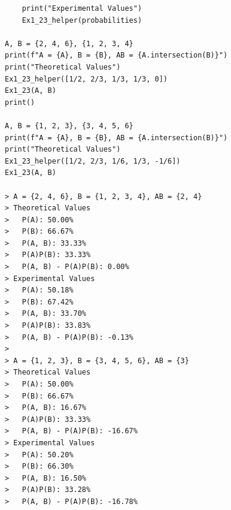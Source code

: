 \documentclass{article}
\begin{document}
\begin{enumerate}
\begin{itemize}
\begin{verbatim}
    print("Experimental Values")
    Ex1_23_helper(probabilities)

A, B = {2, 4, 6}, {1, 2, 3, 4}
print(f"A = {A}, B = {B}, AB = {A.intersection(B)}")
print("Theoretical Values")
Ex1_23_helper([1/2, 2/3, 1/3, 1/3, 0])
Ex1_23(A, B)
print()

A, B = {1, 2, 3}, {3, 4, 5, 6}
print(f"A = {A}, B = {B}, AB = {A.intersection(B)}")
print("Theoretical Values")
Ex1_23_helper([1/2, 2/3, 1/6, 1/3, -1/6])
Ex1_23(A, B)

> A = {2, 4, 6}, B = {1, 2, 3, 4}, AB = {2, 4}
> Theoretical Values
> 	P(A): 50.00%
> 	P(B): 66.67%
> 	P(A, B): 33.33%
> 	P(A)P(B): 33.33%
> 	P(A, B) - P(A)P(B): 0.00%
> Experimental Values
> 	P(A): 50.18%
> 	P(B): 67.42%
> 	P(A, B): 33.70%
> 	P(A)P(B): 33.83%
> 	P(A, B) - P(A)P(B): -0.13%
> 
> A = {1, 2, 3}, B = {3, 4, 5, 6}, AB = {3}
> Theoretical Values
> 	P(A): 50.00%
> 	P(B): 66.67%
> 	P(A, B): 16.67%
> 	P(A)P(B): 33.33%
> 	P(A, B) - P(A)P(B): -16.67%
> Experimental Values
> 	P(A): 50.20%
> 	P(B): 66.30%
> 	P(A, B): 16.50%
> 	P(A)P(B): 33.28%
> 	P(A, B) - P(A)P(B): -16.78%
\end{verbatim}
		\end{itemize}
\end{enumerate}
\end{document}
